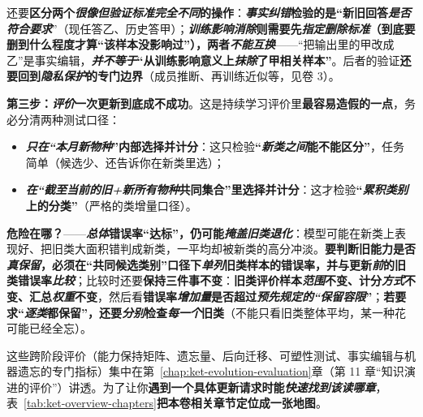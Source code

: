 还要\textbf{区分两个\emph{很像但验证标准完全不同}的操作}：\textbf{\emph{事实纠错}检验的是“新旧回答\emph{是否符合要求}}”（现任答乙、历史答甲）；\textbf{\emph{训练影响消除}则需要先\emph{指定删除标准}（到底要删到什么程度才算“该样本没影响过”），两者\emph{不能互换}}——“把输出里的甲改成乙”是事实编辑，\textbf{\emph{并不等于}“从训练影响意义上\emph{抹除}了甲相关样本”}。后者的验证\textbf{还要回到\emph{隐私保护}的专门边界}（成员推断、再训练近似等，见卷 3）。

\textbf{第三步：\emph{评价}一次更新到底成不成功}。这是持续学习评价里\textbf{最容易造假的一点}，务必分清两种测试口径：
\begin{itemize}\item \textbf{\emph{只在“本月新物种}”内部选择并计分}：这只检验\textbf{“\emph{新类之间}能不能区分”}，任务简单（候选少、还告诉你在新类里选）；\item \textbf{\emph{在“截至当前的\emph{旧+新所有}物种}共同集合”里选择并计分}：这才检验\textbf{“\emph{累积类别}上的分类”}（严格的类增量口径）。\end{itemize}
\textbf{危险在哪？}——\textbf{\emph{总体}错误率“达标”，仍可能\emph{掩盖旧类退化}}：模型可能在新类上表现好、把旧类大面积错判成新类，一平均却被新类的高分冲淡。\textbf{要判断旧能力是否\emph{真保留}，必须在“共同候选类别”口径下\emph{单列}旧类样本的错误率，并与更新\emph{前}的旧类错误率\emph{比较}}；比较时还要\textbf{保持三件事不变}：\textbf{旧类评价样本\emph{范围}不变、计分\emph{方式}不变、汇总\emph{权重}不变}，然后看\textbf{错误率\emph{增加量}是否超过\emph{预先规定的“保留容限}”}；\textbf{若要求“\emph{逐类}都保留”，还要\emph{分别}检查\emph{每一个}旧类}（不能只看旧类整体平均，某一种花可能已经全忘）。

这些跨阶段评价（能力保持矩阵、遗忘量、后向迁移、可塑性测试、事实编辑与机器遗忘的专门指标）集中在第~\ref{chap:ket-evolution-evaluation}章（第 11 章“知识演进的评价”）讲透。为了让你\textbf{遇到一个具体更新请求时能\emph{快速找到该读哪章}}，表~\ref{tab:ket-overview-chapters}\textbf{把本卷相关章节定位成一张地图}。

